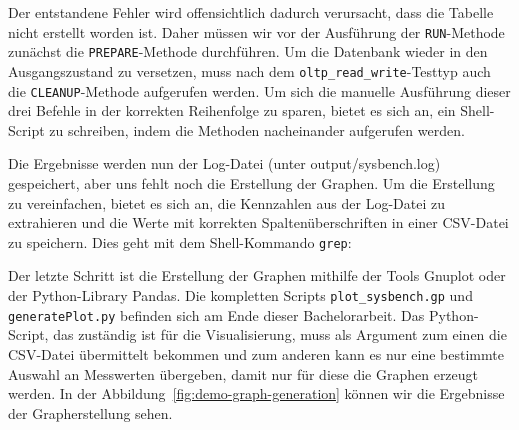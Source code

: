 Der entstandene Fehler wird offensichtlich dadurch verursacht, dass die Tabelle nicht erstellt worden ist.
Daher müssen wir vor der Ausführung der \texttt{RUN}-Methode zunächst die \texttt{PREPARE}-Methode durchführen.
Um die Datenbank wieder in den Ausgangszustand zu versetzen, muss nach dem \texttt{oltp\_read\_write}-Testtyp auch die \texttt{CLEANUP}-Methode aufgerufen werden.
Um sich die manuelle Ausführung dieser drei Befehle in der korrekten Reihenfolge zu sparen, bietet es sich an, ein Shell-Script zu schreiben, indem die Methoden nacheinander aufgerufen werden.

\vspace{-5pt}

\vspace{-5pt}

Die Ergebnisse werden nun der Log-Datei (unter output/sysbench.log) gespeichert, aber uns fehlt noch die Erstellung der Graphen.
Um die Erstellung zu vereinfachen, bietet es sich an, die Kennzahlen aus der Log-Datei zu extrahieren und die Werte mit korrekten Spaltenüberschriften in einer CSV-Datei zu speichern.
Dies geht mit dem Shell-Kommando \texttt{grep}:

\vspace{-5pt}

\vspace{-5pt}

Der letzte Schritt ist die Erstellung der Graphen mithilfe der Tools Gnuplot oder der Python-Library Pandas.
Die kompletten Scripts \texttt{plot\_sysbench.gp} und \texttt{generatePlot.py} befinden sich am Ende dieser Bachelorarbeit.
Das Python-Script, das zuständig ist für die Visualisierung, muss als Argument zum einen die CSV-Datei übermittelt bekommen und zum anderen kann es nur eine bestimmte Auswahl an Messwerten übergeben, damit nur für diese die Graphen erzeugt werden.
In der Abbildung~\ref{fig:demo-graph-generation} können wir die Ergebnisse der Grapherstellung sehen.

\vspace{-5pt}

\vspace{-5pt}

